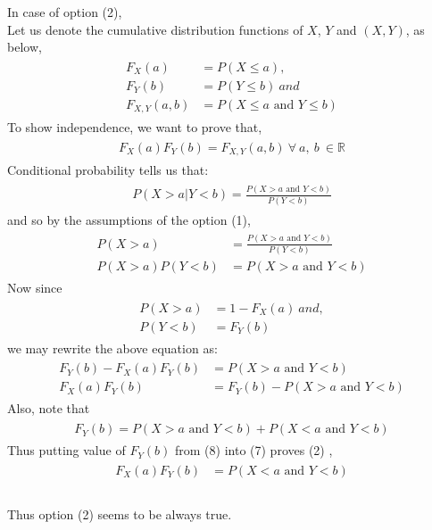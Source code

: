 \documentclass[journal,12pt,twocolumn]{IEEEtran}
\begin{document}
In case of option (2),\\
Let us denote the cumulative distribution functions of $X$, $Y$ and $(X, Y)$, as below,\\
\begin{align}\tag{2}
    \begin{split}
        F_X(a) &= P(X \leq a),\\
        F_Y(b) &= P(Y \leq b)\ and \\
        F_{X,Y}(a,b) &= P(X \leq a \mbox{ and } Y \leq b) 
    \end{split}
\end{align}
To show independence, we want to prove that,
\begin{align}\tag{3}
    \begin{split}
        F_X(a)F_Y(b) = F_{X, Y}(a,b)\ \forall\ a,\ b\ \in \mathbb{R}
    \end{split}
\end{align}
Conditional probability tells us that: 
\begin{align}\tag{4}
    \begin{split}
        P(X > a | Y < b) = \frac{P(X > a \mbox{ and } Y < b)}{P(Y < b)}
    \end{split}
\end{align}
and so by the assumptions of the option (1),
\begin{align}\tag{5}
    \begin{split}
        P(X > a) &= \frac{P(X > a \mbox{ and } Y < b)}{P(Y < b)}\\
        P(X > a)P(Y < b) &= P(X > a \mbox{ and } Y < b)
    \end{split}
\end{align}
Now since 
\begin{align}\tag{6}
    \begin{split}
        P(X > a) &= 1 - F_X(a)\ and,\\
        P(Y < b) &= F_Y(b)
    \end{split}
\end{align}
we may rewrite the above equation as:
\begin{align}\tag{7}
    \begin{split}
        F_Y(b) - F_X(a)F_Y(b) &= P(X > a \mbox{ and } Y < b)\\
        F_X(a)F_Y(b) &= F_Y(b) - P(X > a \mbox{ and } Y < b)
    \end{split}
\end{align}
Also, note that 
\begin{align}\tag{8}
    \begin{split}
        F_Y(b) = P(X > a \mbox{ and } Y < b) + P(X < a \mbox{ and } Y < b)
    \end{split}
\end{align}
Thus putting value of $F_Y(b)$ from (8) into (7) proves (2) ,
\begin{align}\tag{9}
    \begin{split}
        F_X(a)F_Y(b) &= P(X < a \mbox{ and } Y < b)\\
    \end{split}
\end{align}\\
Thus option (2) seems to be always true.\\
\end{document}
